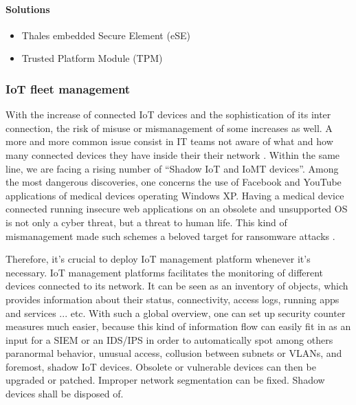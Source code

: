 \paragraph{Solutions}

\begin{itemize}
	\item Thales embedded Secure Element (eSE)
	\item Trusted Platform Module (TPM)
\end{itemize}


\subsubsection{IoT fleet management}

With the increase of connected IoT devices and the sophistication of its inter connection, the risk of misuse or mismanagement of some increases as well. A more and more common issue consist in IT teams not aware of what and how many connected devices they have inside their their network \cite{helpnetsecurity}. Within the same line, we are facing a rising number of “Shadow IoT and IoMT devices”. Among the most dangerous discoveries, one concerns the use of Facebook and YouTube applications of medical devices operating Windows XP. Having a medical device connected running insecure web applications on an obsolete and unsupported OS is not only a cyber threat, but a threat to human life. This kind of mismanagement made such schemes a beloved target for ransomware attacks \cite{cpomagazine}.

Therefore, it’s crucial to deploy IoT management platform whenever it’s necessary. IoT management platforms facilitates the monitoring of different devices connected to its network. It can be seen as an inventory of objects, which provides information about their status, connectivity, access logs, running apps and services ... etc. With such a global overview, one can set up security counter measures much easier, because this kind of information flow can easily fit in as an input for a SIEM or an IDS/IPS in order to automatically spot among others paranormal behavior, unusual access, collusion between subnets or VLANs, and foremost, shadow IoT devices. Obsolete or vulnerable devices can then be upgraded or patched. Improper network segmentation can be fixed. Shadow devices shall be disposed of.

